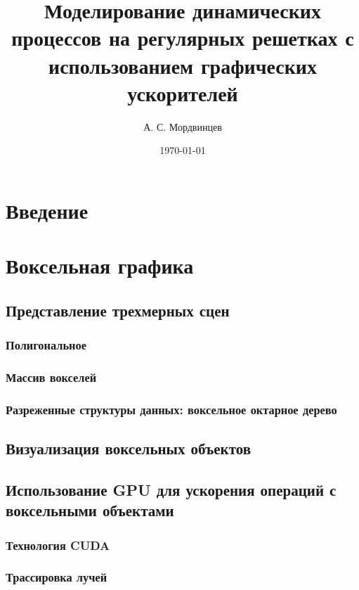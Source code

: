 \documentclass[a4paper,14pt]{extreport}
\begin{document}
\title{Моделирование динамических процессов на регулярных решетках с использованием графических ускорителей}
\author{А. С. Мордвинцев}
\date{\today}


\sloppy  %

\maketitle

\setcounter{page}{3}

\tableofcontents

\chapter*{Введение}

\chapter{Воксельная графика}
\section{Представление трехмерных сцен}
\subsection{Полигональное}
\subsection{Массив вокселей}
\subsection{Разреженные структуры данных: воксельное октарное дерево}
\section{Визуализация воксельных объектов}
\section{Использование GPU для ускорения операций с воксельными объектами}
\subsection{Технология CUDA}
\subsection{Трассировка лучей}
\end{document}
